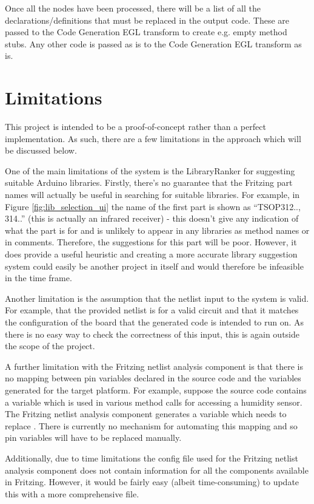 \documentclass{UoYCSproject}
\begin{document}
Once all the nodes have been processed, there will be a list of all the declarations/definitions that must be replaced in the output code. These are passed to the Code Generation EGL transform to create e.g. empty method stubs. Any other code is passed as is to the Code Generation EGL transform as is.

\section{Limitations}
This project is intended to be a proof-of-concept rather than a perfect implementation. As such, there are a few limitations in the approach which will be discussed below.

One of the main limitations of the system is the LibraryRanker for suggesting suitable Arduino libraries. Firstly, there's no guarantee that the Fritzing part names will actually be useful in searching for suitable libraries. For example, in Figure \ref{fig:lib_selection_ui} the name of the first part is shown as ``TSOP312.., 314..'' (this is actually an infrared receiver) - this doesn't give any indication of what the part is for and is unlikely to appear in any libraries as method names or in comments. Therefore, the suggestions for this part will be poor. However, it does provide a useful heuristic and creating a more accurate library suggestion system could easily be another project in itself and would therefore be infeasible in the time frame.

Another limitation is the assumption that the netlist input to the system is valid. For example, that the provided netlist is for a valid circuit and that it matches the configuration of the board that the generated code is intended to run on. As there is no easy way to check the correctness of this input, this is again outside the scope of the project.

A further limitation with the Fritzing netlist analysis component is that there is no mapping between pin variables declared in the source code and the variables generated for the target platform. For example, suppose the source code contains a variable  which is used in various method calls for accessing a humidity sensor. The Fritzing netlist analysis component generates a variable  which needs to replace . There is currently no mechanism for automating this mapping and so pin variables will have to be replaced manually.

Additionally, due to time limitations the config file used for the Fritzing netlist analysis component does not contain information for all the components available in Fritzing. However, it would be fairly easy (albeit time-consuming) to update this with a more comprehensive file.
\end{document}
